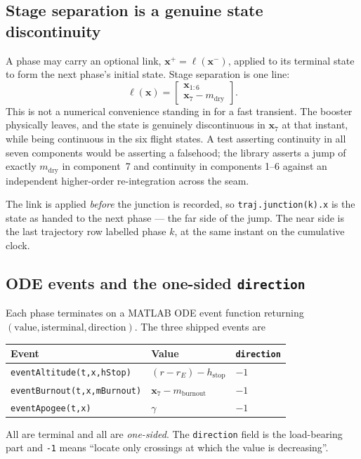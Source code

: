 \documentclass[11pt]{article}
\newcommand{\code}[1]{\texttt{#1}}
\begin{document}
\subsection{Stage separation is a genuine state discontinuity}

A phase may carry an optional link, $\mathbf{x}^+ = \ell(\mathbf{x}^-)$, applied
to its terminal state to form the next phase's initial state. Stage separation
is one line:
\begin{equation}
  \ell(\mathbf{x}) = \begin{bmatrix} \mathbf{x}_{1:6} \\
                     \mathbf{x}_7 - m_{\text{dry}} \end{bmatrix} .
  \label{eq:link}
\end{equation}
This is not a numerical convenience standing in for a fast transient. The
booster physically leaves, and the state is genuinely discontinuous in
$\mathbf{x}_7$ at that instant, while being continuous in the six flight
states. A test asserting continuity in all seven components would be asserting
a falsehood; the library asserts a jump of exactly $m_{\text{dry}}$ in
component~7 and continuity in components 1--6 against an independent
higher-order re-integration across the seam.

The link is applied \emph{before} the junction is recorded, so
\code{traj.junction(k).x} is the state as handed to the next phase --- the far
side of the jump. The near side is the last trajectory row labelled phase $k$,
at the same instant on the cumulative clock.

\subsection{ODE events and the one-sided \code{direction}}

Each phase terminates on a MATLAB ODE event function returning
$(\text{value},\text{isterminal},\text{direction})$. The three shipped events
are
\begin{center}
\begin{tabular}{lll}
\toprule
Event & Value & \code{direction} \\
\midrule
\code{eventAltitude(t,x,hStop)}   & $(r - r_E) - h_{\text{stop}}$ & $-1$ \\
\code{eventBurnout(t,x,mBurnout)} & $\mathbf{x}_7 - m_{\text{burnout}}$ & $-1$ \\
\code{eventApogee(t,x)}           & $\gamma$ & $-1$ \\
\bottomrule
\end{tabular}
\end{center}
All are terminal and all are \emph{one-sided}. The \code{direction} field is
the load-bearing part and \code{-1} means ``locate only crossings at which the
value is decreasing''.
\end{document}
